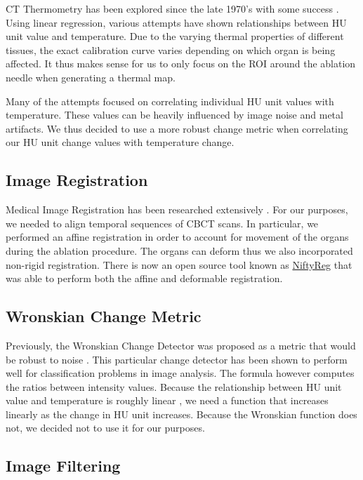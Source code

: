 \documentclass[]{spie}  %
\begin{document}
CT Thermometry has been explored since the late 1970's with some success \cite{Fani14}. Using linear regression, various attempts have shown relationships between HU unit value and temperature. Due to the varying thermal properties of different tissues, the exact calibration curve varies depending on which organ is being affected. It thus makes sense for us to only focus on the ROI around the ablation needle when generating a thermal map. 

Many of the attempts focused on correlating individual HU unit values with temperature. These values can be heavily influenced by image noise and metal artifacts. We thus decided to use a more robust change metric when correlating our HU unit change values with temperature change.  

\subsection{Image Registration}

Medical Image Registration has been researched extensively \cite{Oliveira14, Hill01}. For our purposes, we needed to align temporal sequences of CBCT scans. In particular, we performed an affine registration in order to account for movement of the organs during the ablation procedure. The organs can deform thus we also incorporated non-rigid registration. There is now an open source tool known as \href{http://cmictig.cs.ucl.ac.uk/wiki/index.php/NiftyReg}{NiftyReg} \cite{Ourselin01,Modat10} that was able to perform both the affine \cite{Ourselin01} and deformable \cite{Modat10} registration.   

\subsection{Wronskian Change Metric}

Previously, the Wronskian Change Detector \cite{Durucan01} was proposed as a metric that would be robust to noise \cite{Li13}. This particular change detector has been shown to perform well for classification problems \cite{Panda13,Durucan01,Ang11,Subudhi13} in image analysis. The formula however computes the ratios between intensity values. Because the relationship between HU unit value and temperature is roughly linear \cite{Fani14}, we need a function that increases linearly as the change in HU unit increases. Because the Wronskian function does not, we decided not to use it for our purposes. 

\subsection{Image Filtering}
\end{document}
